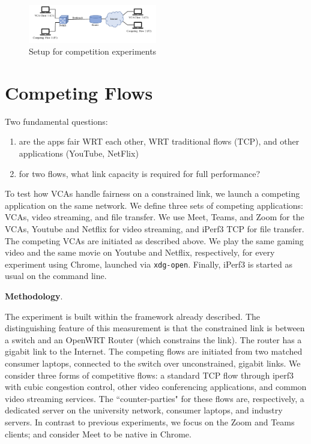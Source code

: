 \begin{figure}[t]
   \centering
    \includegraphics[width=0.5\textwidth,keepaspectratio]{../figures/methodology/competition-setup.pdf}
    \caption{Setup for competition experiments}
    \label{fig:loss_latency}
\end{figure}

\section{Competing Flows}
Two fundamental questions:
\begin{enumerate}
    \item are the apps fair WRT each other, WRT traditional flows (TCP), and other applications (YouTube, NetFlix)
    \item for two flows, what link capacity is required for full performance?
\end{enumerate}

To test how VCAs handle fairness on a constrained link, we launch a competing application on the same network. We define three sets of competing applications: VCAs, video streaming, and file transfer. We use Meet, Teams, and Zoom for the VCAs, Youtube and Netflix for video streaming, and iPerf3 TCP for file transfer. The competing VCAs are initiated as described above. We play the same gaming video and the same movie on Youtube and Netflix, respectively, for every experiment using Chrome, launched via \texttt{xdg-open}. Finally, iPerf3 is started as usual on the command line.


\noindent \textbf{Methodology}.



The experiment is built within the framework already described.
The distinguishing feature of this measurement is that the 
  constrained link is between a switch and an OpenWRT Router 
    (which constrains the link).
The router has a gigabit link to the Internet.
The competing flows are initiated from two matched consumer laptops,
  connected to the switch over unconstrained, gigabit links.
We consider three forms of competitive flows:
  a standard TCP flow through iperf3 with cubic congestion control,
  other video conferencing applications, and 
  common video streaming services.
The ``counter-parties" for these flows are, respectively,
  a dedicated server on the university network,
  consumer laptops, and industry servers.
In contrast to previous experiments, 
  we focus on the Zoom and Teams clients;
  and consider Meet to be native in Chrome.

